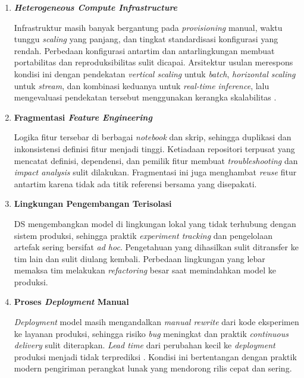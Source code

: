 \vspace{0.5em}
\begin{enumerate}
    \item \textbf{\textit{Heterogeneous Compute Infrastructure}}  

    Infrastruktur masih banyak bergantung pada \textit{provisioning} manual, waktu tunggu \textit{scaling} yang panjang, dan tingkat standardisasi konfigurasi yang rendah. Perbedaan konfigurasi antartim dan antarlingkungan membuat portabilitas dan reproduksibilitas sulit dicapai. Arsitektur usulan merespons kondisi ini dengan pendekatan \textit{vertical scaling} untuk \textit{batch}, \textit{horizontal scaling} untuk \textit{stream}, dan kombinasi keduanya untuk \textit{real-time inference}, lalu mengevaluasi pendekatan tersebut menggunakan kerangka skalabilitas \textcite{jogalekar2000evaluating}.

    \vspace{0.5em}

    \item \textbf{Fragmentasi \textit{Feature Engineering}}  

    Logika fitur tersebar di berbagai \textit{notebook} dan skrip, sehingga duplikasi dan inkonsistensi definisi fitur menjadi tinggi. Ketiadaan repositori terpusat yang mencatat definisi, dependensi, dan pemilik fitur membuat \textit{troubleshooting} dan \textit{impact analysis} sulit dilakukan. Fragmentasi ini juga menghambat \textit{reuse} fitur antartim karena tidak ada titik referensi bersama yang disepakati.

    \vspace{0.5em}

    \item \textbf{Lingkungan Pengembangan Terisolasi}  

    DS mengembangkan model di lingkungan lokal yang tidak terhubung dengan sistem produksi, sehingga praktik \textit{experiment tracking} dan pengelolaan artefak sering bersifat \textit{ad hoc}. Pengetahuan yang dihasilkan sulit ditransfer ke tim lain dan sulit diulang kembali. Perbedaan lingkungan yang lebar memaksa tim melakukan \textit{refactoring} besar saat memindahkan model ke produksi.

    \vspace{0.5em}

    \item \textbf{Proses \textit{Deployment} Manual}  

    \textit{Deployment} model masih mengandalkan \textit{manual rewrite} dari kode eksperimen ke layanan produksi, sehingga risiko \textit{bug} meningkat dan praktik \textit{continuous delivery} sulit diterapkan. \textit{Lead time} dari perubahan kecil ke \textit{deployment} produksi menjadi tidak terprediksi \autocite{paleyes2022challenges}. Kondisi ini bertentangan dengan praktik modern pengiriman perangkat lunak yang mendorong rilis cepat dan sering.


\end{enumerate}
